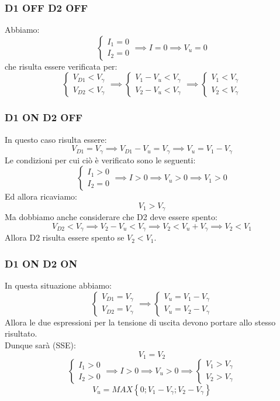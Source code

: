 \documentclass[../main.tex]{subfiles}
\begin{document}
	\subsubsection{D1 OFF D2 OFF}
	Abbiamo:
	$$\begin{cases} I_1 = 0 \\ I_2 = 0 \end{cases} \implies I = 0 \implies V_u = 0$$
	che risulta essere verificata per:
	$$\begin{cases} V_{D1} < V_\gamma \\ V_{D2} < V_\gamma \end{cases} \implies \begin{cases} V_1 - V_u < V_\gamma \\ V_2 - V_u < V_\gamma \end{cases} \implies \begin{cases} V_1 < V_\gamma \\ V_2 < V_\gamma \end{cases}$$
	\subsubsection{D1 ON D2 OFF}
	\label{subsub:ril-max-on-off}
	In questo caso risulta essere:
	$$V_{D1} = V_\gamma \implies V_{D1} - V_u = V_\gamma \implies V_u = V_1 - V_\gamma$$
	Le condizioni per cui ciò è verificato sono le seguenti:
	$$\begin{cases} I_1 > 0 \\ I_2 = 0 \end{cases} \implies I > 0 \implies V_u > 0 \implies V_1 > 0$$
	Ed allora ricaviamo:
	$$V_1 > V_\gamma$$
	Ma dobbiamo anche considerare che D2 deve essere spento:
	$$V_{D2} < V_\gamma \implies V_2 - V_u < V_\gamma \implies V_2 < V_u + V_\gamma \implies V_2 < V_1$$
	Allora D2 risulta essere spento se $V_2 < V_1$.
	\subsubsection{D1 ON D2 ON}
	In questa situazione abbiamo:
	$$\begin{cases} V_{D1} = V_\gamma \\ V_{D2} = V_\gamma \end{cases} \implies \begin{cases} V_u = V_1 - V_\gamma \\ V_u = V_2 - V_\gamma \end{cases}$$
	Allora le due espressioni per la tensione di uscita devono portare allo stesso risultato. \\
	Dunque sarà (SSE):
	$$V_1 = V_2$$
	$$\begin{cases} I_1 > 0 \\ I_2 > 0 \end{cases} \implies I > 0 \implies V_u > 0 \implies \begin{cases} V_1 > V_\gamma \\ V_2 > V_\gamma \end{cases}$$
	$$V_u = MAX \left\{ 0; V_1 - V_\gamma; V_2 - V_\gamma \right\}$$
\end{document}
